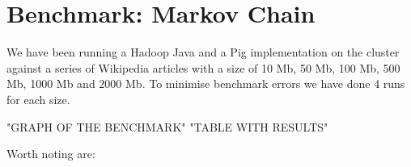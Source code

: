 \section{Benchmark: Markov Chain}

We have been running a Hadoop Java and a Pig implementation on the cluster against a series of Wikipedia articles with a size of 10 Mb, 50 Mb, 100 Mb, 500 Mb, 1000 Mb and 2000 Mb. To minimise benchmark errors we have done 4 runs for each size.

{"GRAPH OF THE BENCHMARK"}
{"TABLE WITH RESULTS"}

Worth noting are:        